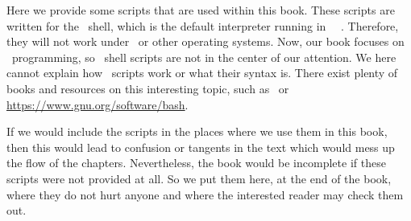 %
%
%
%
%
%
%
%
%
%
%
%
Here we provide some scripts that are used within this book.
These scripts are written for the \bash\ shell, which is the default interpreter running in \ubuntu\ \linux\ .
Therefore, they will not work under \microsoftWindows\ or other operating systems.
Now, our book focuses on \python\ programming, so \bash\ shell scripts are not in the center of our attention.
We here cannot explain how \bash\ scripts work or what their syntax is.
There exist plenty of books and resources on this interesting topic, such as~\cite{NR2005LTBSUSPCB3,Z2017MB,BN2018BC} or \url{https://www.gnu.org/software/bash}.

If we would include the scripts in the places where we use them in this book, then this would lead to confusion or tangents in the text which would mess up the flow of the chapters.
Nevertheless, the book would be incomplete if these scripts were not provided at all.
So we put them here, at the end of the book, where they do not hurt anyone and where the interested reader may check them out.

